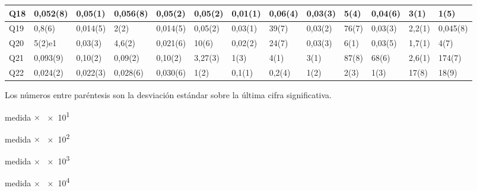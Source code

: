 \documentclass[12pt, letter paper]{report}
\begin{document}
\begin{landscape}
\begin{table}
\begin{threeparttable}
\begin{tabular}{| l | l | l | l | l | l | l | l | l | l | l | l | l |}
                Q18 & 0,052(8)     & 0,05(1)      & 0,056(8)       & 0,05(2)        & 0,05(2)         & 0,01(1)         & 0,06(4)        & 0,03(3)        & 5(4)           & 0,04(6)        & 3(1)\tnote{2}   & 1(5)            \\ \hline
                Q19 & 0,8(6)       & 0,014(5)     & 2(2)           & 0,014(5)       & 0,05(2)         & 0,03(1)         & 39(7)          & 0,03(2)        & 76(7)          & 0,03(3)        & 2,2(1)\tnote{3} & 0,045(8)        \\ \hline
                Q20 & 5(2)e1       & 0,03(3)      & 4,6(2)\tnote{3}& 0,021(6)       & 10(6)           & 0,02(2)         & 24(7)          & 0,03(3)        & 6(1)\tnote{2}  & 0,03(5)        & 1,7(1)\tnote{3} & 4(7)            \\ \hline
                Q21 & 0,093(9)     & 0,10(2)      & 0,09(2)        & 0,10(2)        & 3,27(3)\tnote{4}& 1(3)            & 4(1)\tnote{2}  & 3(1)\tnote{2}  & 87(8)          & 68(6)          & 2,6(1)\tnote{3} & 174(7)          \\ \hline
                Q22 & 0,024(2)     & 0,022(3)     & 0,028(6)       & 0,030(6)       & 1(2)            & 0,1(1)          & 0,2(4)         & 1(2)           & 2(3)           & 1(3)           & 17(8)           & 18(9)           \\ \hline
              \end{tabular}
              \begin{tablenotes}
                \item[1] Los números entre paréntesis son la desviación estándar
                sobre la última cifra significativa.
                \item[2] medida $\times$ \num{e1}
                \item[3] medida $\times$ \num{e2}
                \item[4] medida $\times$ \num{e3}
                \item[5] medida $\times$ \num{e4}
              \end{tablenotes}
              \label{tab:neto}
            \end{threeparttable}
          \end{table}
        \end{landscape}
\end{document}
